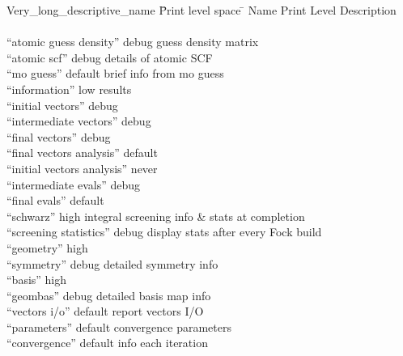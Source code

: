 \begin{tabbing}
  Very\_long\_descriptive\_name \= Print level space \= \kill
  Name                    \> Print Level \> Description \\
                          \>        \> \\
 ``atomic guess density'' \> debug  \> guess density matrix \\
 ``atomic scf''           \> debug  \> details of atomic SCF \\
 ``mo guess''             \> default\> brief info from mo guess \\
 ``information''          \> low    \> results  \\
 ``initial vectors''      \> debug  \> \\
 ``intermediate vectors'' \> debug  \> \\
 ``final vectors''        \> debug  \> \\
 ``final vectors analysis''        \> default  \> \\
 ``initial vectors analysis''        \> never  \> \\
 ``intermediate evals''   \> debug  \> \\
 ``final evals''          \> default\> \\
 ``schwarz''              \> high   \> integral screening info \&
  stats at completion\\
 ``screening statistics'' \> debug  \> display stats after every Fock build \\
 ``geometry''             \> high   \> \\
 ``symmetry''             \> debug  \> detailed symmetry info \\
 ``basis''                \> high   \> \\
 ``geombas''              \> debug  \> detailed basis map info \\
 ``vectors i/o''          \> default\> report vectors I/O \\
 ``parameters''           \> default\> convergence parameters \\
 ``convergence''          \> default\> info each iteration
\end{tabbing}

